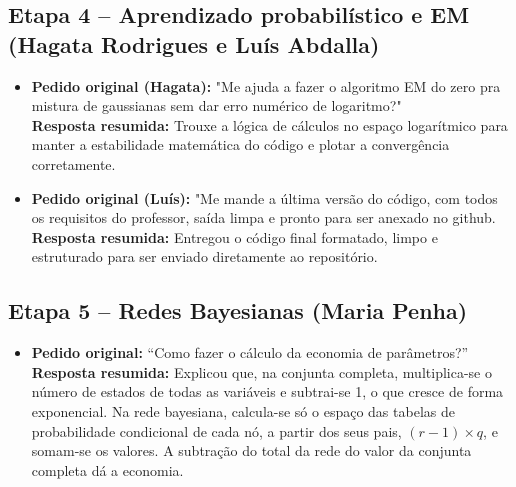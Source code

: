 \documentclass[11pt]{article}
\begin{document}
\subsection*{Etapa 4 -- Aprendizado probabilístico e EM (Hagata Rodrigues e Luís Abdalla)}
\begin{itemize}
    \item \textbf{Pedido original (Hagata):} "Me ajuda a fazer o algoritmo EM do zero pra mistura de gaussianas sem dar erro numérico de logaritmo?" \\
    \textbf{Resposta resumida:} Trouxe a lógica de cálculos no espaço logarítmico para manter a estabilidade matemática do código e plotar a convergência corretamente.
    
    \item \textbf{Pedido original (Luís):} "Me mande a última versão do código, com todos os requisitos do professor, saída limpa e pronto para ser anexado no github. \\
    \textbf{Resposta resumida:} Entregou o código final formatado, limpo e estruturado para ser enviado diretamente ao repositório.
\end{itemize}


\subsection*{Etapa 5 -- Redes Bayesianas (Maria Penha)}
\begin{itemize}
    \item \textbf{Pedido original:} ``Como fazer o cálculo da economia de parâmetros?'' \\
    \textbf{Resposta resumida:} Explicou que, na conjunta completa, multiplica-se o número de estados de todas as variáveis e subtrai-se 1, o que cresce de forma exponencial. Na rede bayesiana, calcula-se só o espaço das tabelas de probabilidade condicional de cada nó, a partir dos seus pais, $(r-1)\times q$, e somam-se os valores. A subtração do total da rede do valor da conjunta completa dá a economia.

\end{itemize}
\end{document}
